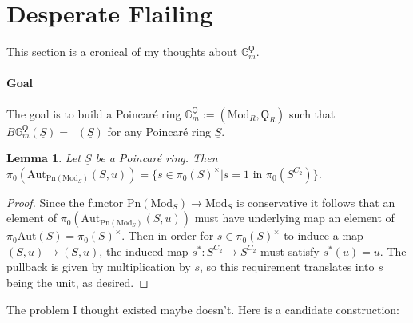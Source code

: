 \documentclass{article}
\DeclareMathOperator{\Picp}{Pic^p} %
\newtheorem{lemma}[theorem]{Lemma}
\theoremstyle{definition}
\begin{document}
\section{Desperate Flailing}

This section is a cronical of my thoughts about $\mathbb{G}_m^\Qoppa$.
\paragraph{Goal} The goal is to build a Poincar{\'e} ring $\mathbb{G}_{m}^\Qoppa:=(\mathrm{Mod}_R, \Qoppa_R)$  such that $B\mathbb{G}_m^\Qoppa(\underline{S}) = \Picp(\underline{S})$ for any Poincar{\'e} ring $\underline{S}$.
\begin{lemma}
Let $\underline{S}$ be a Poincar{\'e} ring. Then $\pi_0(\mathrm{Aut}_{\mathrm{Pn}(\mathrm{Mod}_S)}(S,u))=\{s\in \pi_0(S)^\times | s=1 \textrm{ in }\pi_0(S^{C_2})\}$.
\end{lemma}
\begin{proof}
Since the functor $\mathrm{Pn}(\mathrm{Mod}_S)\to \mathrm{Mod}_S$ is conservative it follows that an element of $\pi_0(\mathrm{Aut}_{\mathrm{Pn}(\mathrm{Mod}_S)}(S,u))$ must have underlying map an element of $\pi_0\mathrm{Aut}(S)=\pi_0(S)^\times$. Then in order for $s\in \pi_0(S)^\times$ to induce a map $(S,u)\to (S,u)$, the induced map $s^*:S^{C_2}\to S^{C_2}$ must satisfy $s^*(u)=u$. The pullback is given by multiplication by $s$, so this requirement translates into $s$ being the unit, as desired.
\end{proof}

The problem I thought existed maybe doesn't. Here is a candidate construction:
\end{document}

